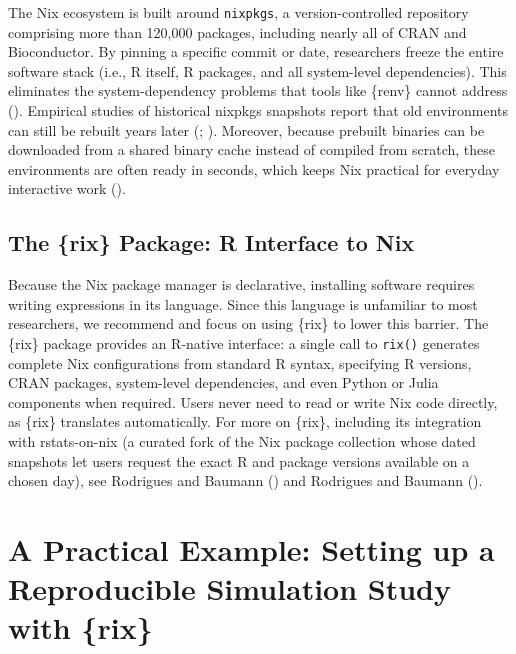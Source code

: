 \documentclass[
  man,
  longtable,
  nolmodern,
  notxfonts,
  notimes,
  colorlinks=true,linkcolor=blue,citecolor=blue,urlcolor=blue]{apa7}
\begin{document}
The Nix ecosystem is built around \texttt{nixpkgs}, a version-controlled
repository comprising more than 120,000 packages, including nearly all
of CRAN and Bioconductor. By pinning a specific commit or date,
researchers freeze the entire software stack (i.e., R itself, R
packages, and all system-level dependencies). This eliminates the
system-dependency problems that tools like \{renv\} cannot address
().
Empirical studies of historical nixpkgs snapshots report that old
environments can still be rebuilt years later
(;
). Moreover, because prebuilt binaries can be downloaded from a
shared binary cache instead of compiled from scratch, these environments
are often ready in seconds, which keeps Nix practical for everyday
interactive work ().

\subsection{The \{rix\} Package: R Interface to
Nix}\label{the-rix-package-r-interface-to-nix}

Because the Nix package manager is declarative, installing software
requires writing expressions in its language. Since this language is
unfamiliar to most researchers, we recommend and focus on using \{rix\}
to lower this barrier. The \{rix\} package provides an R-native
interface: a single call to \texttt{rix()} generates complete Nix
configurations from standard R syntax, specifying R versions, CRAN
packages, system-level dependencies, and even Python or Julia components
when required. Users never need to read or write Nix code directly, as
\{rix\} translates automatically. For more on \{rix\}, including its
integration with rstats-on-nix (a curated fork of the Nix package
collection whose dated snapshots let users request the exact R and
package versions available on a chosen day), see Rodrigues and Baumann
() and Rodrigues and Baumann
().

\section{A Practical Example: Setting up a Reproducible Simulation Study
with
\{rix\}}\label{a-practical-example-setting-up-a-reproducible-simulation-study-with-rix}
\end{document}
